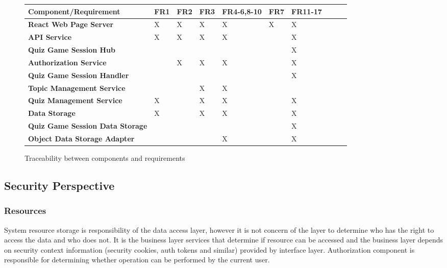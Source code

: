 \begin{figure}[H]
  \label{tab:functional-viewpoint-component-traceability}
  \centering
  \begin{adjustbox}{max width=\textwidth}
    \begin{tabular}{|l|l|l|l|l|l|l|l|l|l|}
      \hline
      \textbf{Component/Requirement} & \textbf{FR1} & \textbf{FR2} & \textbf{FR3} & \textbf{FR4-6,8-10} & \textbf{FR7} & \textbf{FR11-17}\\ \hline
      \textbf{React Web Page Server} & X & X & X & X & X & X \\ \hline
      \textbf{API Service} & X & X & X & X & ~ & X \\ \hline
      \textbf{Quiz Game Session Hub} & ~ & ~ & ~ & ~ & ~ & X \\ \hline
      \textbf{Authorization Service} & ~ & X & X & X & ~ & X \\ \hline
      \textbf{Quiz Game Session Handler} & ~ & ~ & ~ & ~ & ~ & X \\ \hline
      \textbf{Topic Management Service} & ~ & ~ & X & X & ~ & ~ \\ \hline
      \textbf{Quiz Management Service} & X & ~ & X & X & ~ & X \\ \hline
      \textbf{Data Storage} & X & ~ & X & X & ~ & X \\ \hline
      \textbf{Quiz Game Session Data Storage} & ~ & ~ & ~ & ~ & ~ & X \\ \hline
      \textbf{Object Data Storage Adapter} & ~ & ~ & ~ & X & ~ & X \\ \hline
  \end{tabular}
\end{adjustbox}
  \caption{Traceability between components and requirements}
\end{figure}

\subsection{Security Perspective}

\subsubsection{Resources}

System resource storage is responsibility of the data access layer, however it is not concern of the layer to determine who has the right to access the data and who does not. It is the business layer services that determine if resource can be accessed and the business layer depends on security context information (security cookies, auth tokens and similar) provided by interface layer. Authorization component is responsible for determining whether operation can be performed by the current user.

